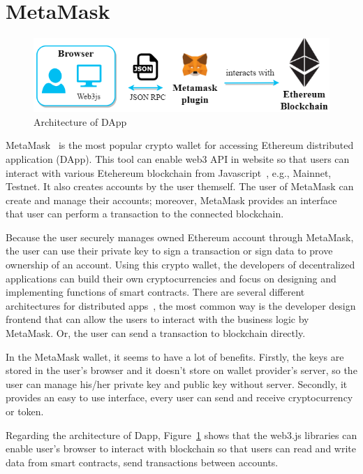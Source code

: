     \section{MetaMask}
        \begin{figure}[htb]
            \centering
            \includegraphics[height=!,width=1\linewidth,keepaspectratio=true]{figures/architecture_of_dapp.png}
            \caption{{\footnotesize Architecture of DApp}}
            \label{fig:architecture_of_dapp}
        \end{figure}
        MetaMask~\cite{metamask} is the most popular crypto wallet for accessing Ethereum distributed application (DApp). This tool can enable web3 API in website so that users can interact with various Etehereum blockchain from Javascript~\cite{web3.js}, e.g., Mainnet, Testnet. It also creates accounts by the user themself. The user of MetaMask can create and manage their accounts; moreover, MetaMask provides an interface that user can perform a transaction to the connected blockchain.\par
        Because the user securely manages owned Ethereum account through MetaMask, the user can use their private key to sign a transaction or sign data to prove ownership of an account. Using this crypto wallet, the developers of decentralized applications can build their own cryptocurrencies and focus on designing and implementing functions of smart contracts. There are several different architectures for distributed apps~\cite{wessling2018engineering}, the most common way is the developer design frontend that can allow the users to interact with the business logic by MetaMask. Or, the user can send a transaction to blockchain directly.\par
        In the MetaMask wallet, it seems to have a lot of benefits. Firstly, the keys are stored in the user's browser and it doesn't store on wallet provider's server, so the user can manage his/her private key and public key without server. Secondly, it provides an easy to use interface, every user can send and receive cryptocurrency or token.\par
        Regarding the architecture of Dapp, Figure~\ref{fig:architecture_of_dapp} shows that the web3.js libraries can enable user's browser to interact with blockchain so that users can read and write data from smart contracts, send transactions between accounts. 



